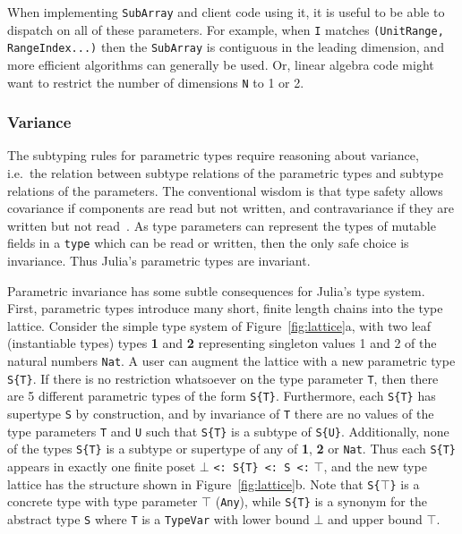 \documentclass[10pt, preprint]{sigplanconf}
\begin{document}
When implementing \verb|SubArray| and client code using it, it is useful
to be able to dispatch on all of these parameters. For example, when
\verb|I| matches \verb|(UnitRange, RangeIndex...)| then the \verb|SubArray|
is contiguous in the leading dimension, and more efficient algorithms can
generally be used. Or, linear algebra code might want to restrict the
number of dimensions \verb|N| to 1 or 2.

\subsubsection{Variance}

The subtyping rules for parametric types require reasoning about variance,
i.e.\ the relation between subtype relations of the parametric types and
subtype relations of the parameters. The conventional wisdom is that type
safety allows covariance if components are read but not written, and
contravariance if they are written but not read~\cite{Castagna1995}. As type
parameters can represent the types of mutable fields in a \verb|type| which can
be read or written, then the only safe choice is invariance. Thus Julia's
parametric types are invariant.

Parametric invariance has some subtle consequences for Julia's type system.
First, parametric types introduce many short, finite length chains into the
type lattice. Consider the simple type system of
Figure~\ref{fig:lattice}a, with two leaf (instantiable types) types \textbf{1}
and \textbf{2} representing singleton values 1 and 2 of the natural numbers
\verb|Nat|. A user can augment the lattice with a new parametric type
\verb|S{T}|. If there is no restriction whatsoever on the type parameter
\verb|T|, then there are 5 different parametric types of the form \verb|S{T}|.
Furthermore, each \verb|S{T}| has supertype \verb|S| by construction, and by
invariance of \verb|T| there are no values of the type parameters \verb|T| and
\verb|U| such that \verb|S{T}| is a subtype of \verb|S{U}|. Additionally, none
of the types \verb|S{T}| is a subtype or supertype of any of \textbf{1},
\textbf{2} or \verb|Nat|. Thus each \verb|S{T}| appears in exactly one finite
poset $\bot$ \verb|<: S{T} <: S <:| $\top$, and the new type lattice has the
structure shown in Figure~\ref{fig:lattice}b. Note that \verb|S{|$\top$\verb|}|
is a concrete type with type parameter $\top$ (\verb|Any|), while \verb|S{T}|
is a synonym for the abstract type \verb|S| where \verb|T| is a \verb|TypeVar|
with lower bound $\bot$ and upper bound $\top$. 
\end{document}
